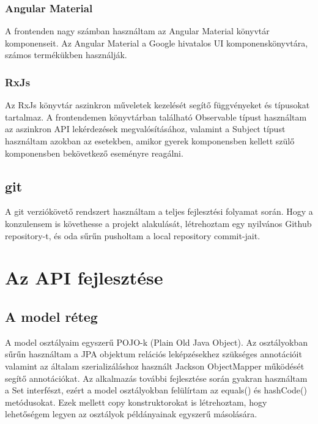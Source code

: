\documentclass[a4paper,12pt]{report}
\theoremstyle{definition}
\theoremstyle{remark}
\begin{document}
	\subsection{Angular Material}

A frontenden nagy számban használtam az Angular Material\cite{Materialwebsite} könyvtár komponenseit. Az Angular Material a Google hivatalos UI komponenskönyvtára, számos termékükben használják.

	\subsection{RxJs}

Az RxJs\cite{Rxjswebsite} könyvtár aszinkron műveletek kezelését segítő függvényeket és típusokat tartalmaz. A frontendemen könyvtárban található Observable típust használtam az aszinkron API lekérdezések megvalósításához, valamint a Subject típust használtam azokban az esetekben, amikor gyerek komponensben kellett szülő komponensben bekövetkező eseményre reagálni.

\section{git}

A git\cite{Gitwebsite} verziókövető rendszert használtam a teljes fejlesztési folyamat során. Hogy a konzulensem is követhesse a projekt alakulását, létrehoztam egy nyilvános Github\cite{GitHubwebsite} repository-t, és oda sűrűn pusholtam a local repository commit-jait.


\chapter{Az API fejlesztése}

\section{A model réteg}

A model osztályaim egyszerű POJO-k (Plain Old Java Object). Az osztályokban sűrűn használtam a JPA objektum relációs leképzésekhez szükséges annotációit valamint az általam szerializáláshoz használt Jackson ObjectMapper működését segítő annotációkat. Az alkalmazás további fejlesztése során gyakran használtam a Set interfészt, ezért a model osztályokban felülírtam az equals() és hashCode() metódusokat. Ezek mellett copy konstruktorokat is létrehoztam, hogy lehetőségem legyen az osztályok példányainak egyszerű másolására.
\end{document}
